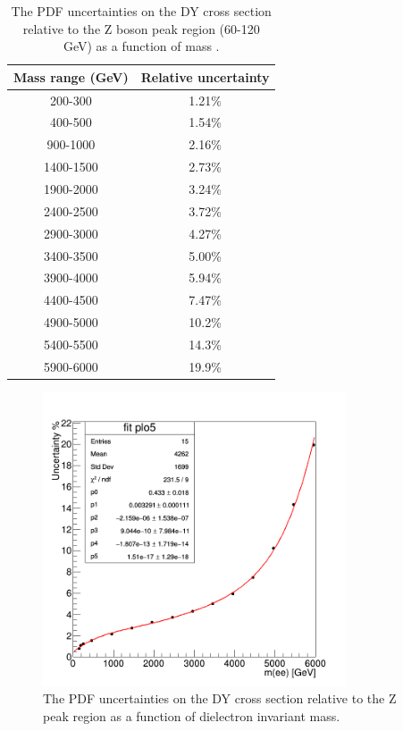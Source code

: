 \begin{table}[t]
\begin{center}
\smallskip\noindent
\begin{tabular}{|c|c|} \hline
Mass range (GeV) & Relative uncertainty \\\hline
 200-300 & 1.21\% \\
 400-500 & 1.54\% \\
900-1000 & 2.16\% \\
1400-1500 & 2.73\% \\
1900-2000 & 3.24\% \\
2400-2500 & 3.72\% \\
2900-3000 & 4.27\% \\
3400-3500 & 5.00\% \\
3900-4000 & 5.94\% \\
4400-4500 & 7.47\% \\
4900-5000 & 10.2\% \\
5400-5500 & 14.3\% \\
5900-6000 & 19.9\% \\\hline
\end{tabular}%
\caption{The PDF uncertainties on the DY cross section relative to the Z boson peak region (60-120 GeV) as a function of mass \cite{CMS-AN-2016-404}.
}
\label{bkg:tab:pdfUncert}
\end{center}
\end{table}

\begin{figure}[bh]
\begin{center}
\includegraphics[angle=0,width=0.8\textwidth]{figures/Zprime/2016/pdf_uncert_relative.png}
\end{center}
\caption{
The PDF uncertainties on the DY cross section relative to the Z peak region as a function of dielectron invariant mass.
}
\label{fig:pdf_rel_uncert}
\end{figure}



\clearpage
